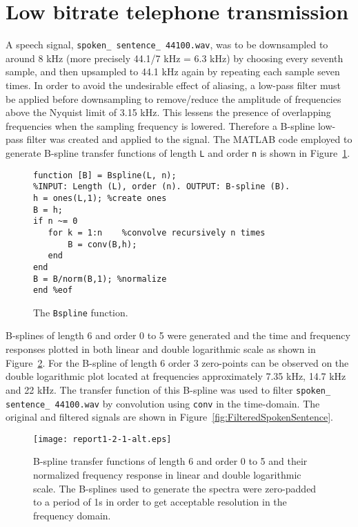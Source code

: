 \section{\large Low bitrate telephone transmission}
A speech signal, \texttt{spoken\_ sentence\_ 44100.wav}, was to be downsampled to around 8 kHz (more precisely 44.1/7 kHz = 6.3 kHz) by choosing every seventh sample, and then upsampled to 44.1 kHz again by repeating each sample seven times. In order to avoid the undesirable effect of aliasing, a low-pass filter must be applied before downsampling to remove/reduce the amplitude of frequencies above the Nyquist limit of 3.15 kHz. This lessens the presence of overlapping frequencies when the sampling frequency is lowered. Therefore a B-spline low-pass filter was created and applied to the signal. The MATLAB code employed to generate B-spline transfer functions of length \texttt{L} and order \texttt{n} is shown in Figure~\ref{fig:B-splineCode}.\\

\begin{figure}[H]
\center
\begin{lstlisting}
function [B] = Bspline(L, n); 
%INPUT: Length (L), order (n). OUTPUT: B-spline (B).
h = ones(L,1); %create ones
B = h;
if n ~= 0 
   for k = 1:n    %convolve recursively n times
       B = conv(B,h);
   end
end
B = B/norm(B,1); %normalize
end %eof
\end{lstlisting}
\caption{The \texttt{Bspline} function.}
\label{fig:B-splineCode}
\end{figure}

B-splines of length 6 and order 0 to 5 were generated and the time and frequency responses plotted in both linear and double logarithmic scale as shown in Figure~\ref{fig:B-splinePlot}. For the B-spline of length 6 order 3 zero-points can be observed on the double logarithmic plot located at frequencies approximately 7.35 kHz, 14.7 kHz and 22 kHz. The transfer function of this B-spline was used to filter \texttt{spoken\_ sentence\_ 44100.wav} by convolution using \texttt{conv} in the time-domain. The original and filtered signals are shown in Figure~\ref{fig:FilteredSpokenSentence}.\\

\begin{figure}[H]
\center
\texttt{[image: report1-2-1-alt.eps]}%
\caption{B-spline transfer functions of length 6 and order 0 to 5 and their normalized frequency response in linear and double logarithmic scale. The B-splines used to generate the spectra were zero-padded to a period of 1s in order to get acceptable resolution in the frequency domain.}
\label{fig:B-splinePlot}
\end{figure}

